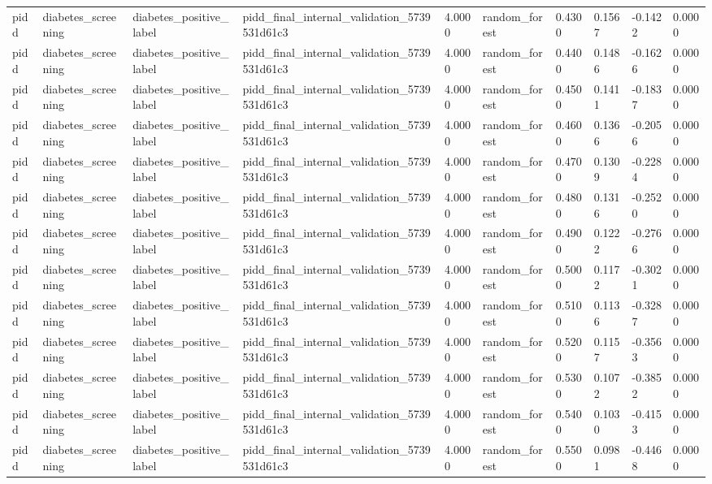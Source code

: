 \begin{tabular}{llllllllll}
pidd & diabetes\_screening & diabetes\_positive\_label & pidd\_final\_internal\_validation\_5739531d61c3 & 4.0000 & random\_forest & 0.4300 & 0.1567 & -0.1422 & 0.0000 \\
pidd & diabetes\_screening & diabetes\_positive\_label & pidd\_final\_internal\_validation\_5739531d61c3 & 4.0000 & random\_forest & 0.4400 & 0.1486 & -0.1626 & 0.0000 \\
pidd & diabetes\_screening & diabetes\_positive\_label & pidd\_final\_internal\_validation\_5739531d61c3 & 4.0000 & random\_forest & 0.4500 & 0.1411 & -0.1837 & 0.0000 \\
pidd & diabetes\_screening & diabetes\_positive\_label & pidd\_final\_internal\_validation\_5739531d61c3 & 4.0000 & random\_forest & 0.4600 & 0.1366 & -0.2056 & 0.0000 \\
pidd & diabetes\_screening & diabetes\_positive\_label & pidd\_final\_internal\_validation\_5739531d61c3 & 4.0000 & random\_forest & 0.4700 & 0.1309 & -0.2284 & 0.0000 \\
pidd & diabetes\_screening & diabetes\_positive\_label & pidd\_final\_internal\_validation\_5739531d61c3 & 4.0000 & random\_forest & 0.4800 & 0.1316 & -0.2520 & 0.0000 \\
pidd & diabetes\_screening & diabetes\_positive\_label & pidd\_final\_internal\_validation\_5739531d61c3 & 4.0000 & random\_forest & 0.4900 & 0.1222 & -0.2766 & 0.0000 \\
pidd & diabetes\_screening & diabetes\_positive\_label & pidd\_final\_internal\_validation\_5739531d61c3 & 4.0000 & random\_forest & 0.5000 & 0.1172 & -0.3021 & 0.0000 \\
pidd & diabetes\_screening & diabetes\_positive\_label & pidd\_final\_internal\_validation\_5739531d61c3 & 4.0000 & random\_forest & 0.5100 & 0.1136 & -0.3287 & 0.0000 \\
pidd & diabetes\_screening & diabetes\_positive\_label & pidd\_final\_internal\_validation\_5739531d61c3 & 4.0000 & random\_forest & 0.5200 & 0.1157 & -0.3563 & 0.0000 \\
pidd & diabetes\_screening & diabetes\_positive\_label & pidd\_final\_internal\_validation\_5739531d61c3 & 4.0000 & random\_forest & 0.5300 & 0.1072 & -0.3852 & 0.0000 \\
pidd & diabetes\_screening & diabetes\_positive\_label & pidd\_final\_internal\_validation\_5739531d61c3 & 4.0000 & random\_forest & 0.5400 & 0.1030 & -0.4153 & 0.0000 \\
pidd & diabetes\_screening & diabetes\_positive\_label & pidd\_final\_internal\_validation\_5739531d61c3 & 4.0000 & random\_forest & 0.5500 & 0.0981 & -0.4468 & 0.0000 \\

\end{tabular}
